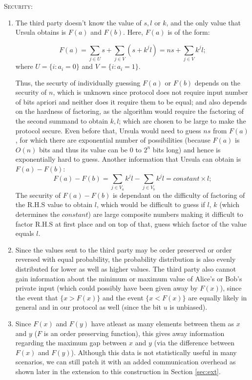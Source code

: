 \documentclass[11pt, letterpaper, romanappendices, onecolumn]{article}
\theoremstyle{plain}\newtheorem{thm}{Theorem}[section]
\theoremstyle{definition}
\theoremstyle{remark}
\begin{document}
\par \textsc{Security:}\label{issue}
\begin{enumerate}
	\item The third party doesn't know the value of $s, l$ or $k$, and the only value that Ursula obtains is $F(a)$ and $F(b)$. Here, $F(a)$ is of the form:

\[
	F(a)=\sum \limits_{j\in U}s + \sum \limits_{j\in V}(s+k^jl)=ns + \sum \limits_{j\in V}k^jl;
\]
where $U=\{i:a_i=0\}$ and $V=\{i:a_i=1\}$. 
\par Thus, the securty of individually guessing $F(a)$ or $F(b)$ depends on the security of $n$, which is unknown since protocol does not require input number of bits apriori and neither does it require them to be equal; and also depends on the hardness of factoring, as the algorithm would require the factoring of the second summand to obtain $k,l$; which are chosen to be large to make the protocol secure. Even before that, Ursula would need to guess $ns$ from $F(a)$, for which there are exponential number of possibilities (because $F(a)$ is $O(n)$ bits and thus its value can be $0$ to $2^n$ bits long) and hence is exponentially hard to guess. Another information that Ursula can obtain is $F(a)-F(b)$:
\[
	F(a)-F(b)=\sum \limits_{j\in V_a}k^jl-\sum \limits_{j\in V_b}k^jl= constant \times l;
\]
The security of $F(a)-F(b)$ is dependant on the difficulty of factoring of the R.H.S value to obtain $l$, which would be difficult to guess if $l$, $k$ (which determines the $constant$) are large composite numbers making it difficult to factor R.H.S at first place and on top of that, guess which factor of the value equals $l$.
	\item Since the values sent to the third party may be order preserved or order reversed with equal probability, the probability distribution is also evenly distributed for lower as well as higher values. The third party also cannot gain information about the minimum or maximum value of Alice's or Bob's private input (which could possibly have been given away by $F(x)$), since the event that $\{x > F(x)\}$ and the event $\{x < F(x)\}$ are equally likely in general and in our protocol as well (since the bit $u$ is unbiased).
	\item Since $F(x)$ and $F(y)$ have atleast as many elements between them as $x$ and $y$ ($F$ is an order preserving function), this gives away information regarding the maximum gap between $x$ and $y$ (via the difference between $F(x)$ and $F(y)$). Although this data is not statistically useful in many scenarios, we can still patch it with an added communication overhead as shown later in the extension to this construction in Section \ref{sec:ext}.
\end{enumerate}
\end{document}
